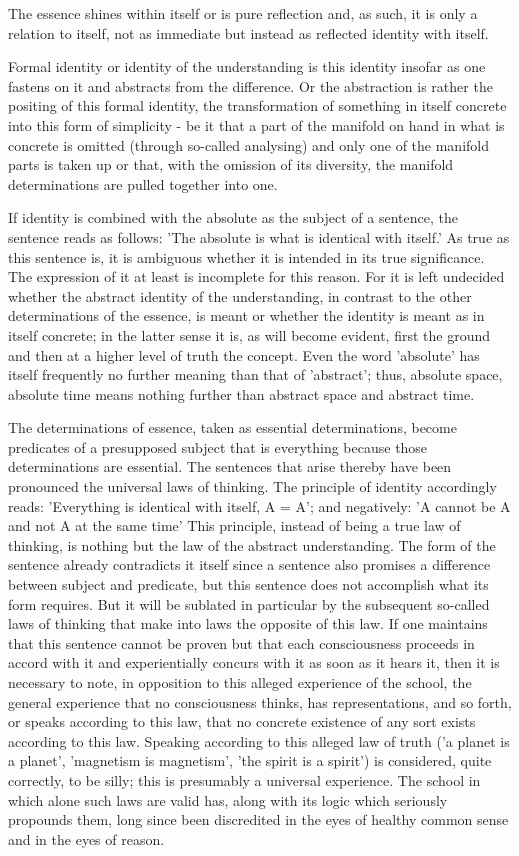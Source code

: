 The essence shines within itself or is pure reflection and, as such,
it is only a relation to itself, not as immediate but instead as
reflected identity with itself.

Formal identity or identity of the understanding is this identity
insofar as one fastens on it and abstracts from the difference.
Or the abstraction is rather the positing of this formal identity,
the transformation of something in itself concrete into this form of
simplicity - be it that a part of the manifold on hand in what is
concrete is omitted (through so-called analysing) and only one of the
manifold parts is taken up or that, with the omission of its diversity,
the manifold determinations are pulled together into one.

If identity is combined with the absolute as the subject of a sentence,
the sentence reads as follows:
'The absolute is what is identical with itself.'
As true as this sentence is, it is ambiguous whether it is intended
in its true significance.
The expression of it at least is incomplete for this reason.
For it is left undecided whether the abstract identity of the understanding,
in contrast to the other determinations of the essence, is meant or
whether the identity is meant as in itself concrete;
in the latter sense it is, as will become evident,
first the ground and then at a higher level of truth the concept.
Even the word 'absolute' has itself frequently no further
meaning than that of 'abstract';
thus, absolute space, absolute time means nothing further than
abstract space and abstract time.

The determinations of essence, taken as essential determinations,
become predicates of a presupposed subject that is everything because
those determinations are essential.
The sentences that arise thereby have been pronounced
the universal laws of thinking.
The principle of identity accordingly reads:
'Everything is identical with itself, A = A';
and negatively:
'A cannot be A and not A at the same time'
This principle, instead of being a true law of thinking,
is nothing but the law of the abstract understanding.
The form of the sentence already contradicts it itself
since a sentence also promises a difference between subject and predicate,
but this sentence does not accomplish what its form requires.
But it will be sublated in particular by the subsequent so-called
laws of thinking that make into laws the opposite of this law.
If one maintains that this sentence cannot be proven but that
each consciousness proceeds in accord with it and
experientially concurs with it as soon as it hears it,
then it is necessary to note,
in opposition to this alleged experience of the school,
the general experience that no consciousness thinks,
has representations, and so forth, or speaks according to this law,
that no concrete existence of any sort exists according to this law.
Speaking according to this alleged law of truth
('a planet is a planet', 'magnetism is magnetism', 'the spirit is a spirit')
is considered, quite correctly, to be silly;
this is presumably a universal experience.
The school in which alone such laws are valid has,
along with its logic which seriously propounds them,
long since been discredited in the eyes of
healthy common sense and in the eyes of reason.

